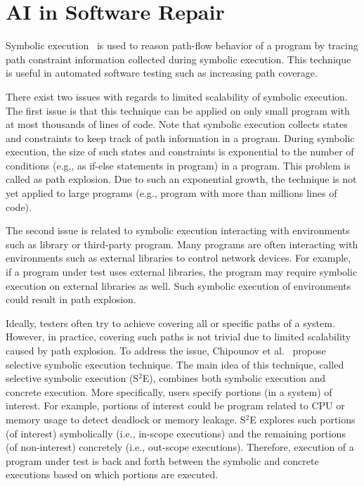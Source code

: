 \section{AI in Software Repair}

Symbolic execution~\cite{symbolic} is used to reason path-flow behavior of a program by tracing path constraint information collected during symbolic execution. This technique is useful in automated software testing such as increasing path coverage.

There exist two issues with regards to limited scalability of symbolic execution. The first issue is that this technique can be applied on only small program with at most thousands of lines of code. Note that symbolic execution collects states and constraints to keep track of path information in a program. During symbolic execution, the size of such states and constraints is exponential to the number of conditions (e.g., as if-else statements in program) in a program. This problem is called as path explosion. Due to such an exponential growth, the technique is not yet applied to large programs (e.g., program with more than millions lines of code).

The second issue is related to symbolic execution interacting with environments such as library or third-party program. Many programs are often interacting with environments such as external libraries to control network devices. For example, if a program under test uses external libraries, the program may require symbolic execution on external libraries as well. Such symbolic execution of environments could result in path explosion.

Ideally, testers often try to achieve covering all or specific paths of a system. However, in practice, covering such paths is not trivial due to limited scalability caused by path explosion. To address the issue, Chipounov et al.~\cite{selective} propose selective symbolic execution technique. The main idea of this technique, called selective symbolic execution (S$^2$E), combines both symbolic execution and concrete execution. More specifically, users specify portions (in a system) of interest. For example, portions of interest could be program related to CPU or memory usage to detect deadlock or memory leakage. S$^2$E explores such portions (of interest) symbolically (i.e., in-scope executions) and the remaining portions (of non-interest) concretely (i.e., out-scope executions). Therefore, execution of a program under test is back and forth between the symbolic and concrete executions based on which portions are executed.

